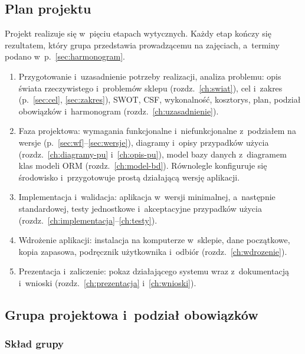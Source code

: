 \documentclass[12pt,a4paper,oneside]{article}
\newcounter{pu}
\begin{document}
\subsection{Plan projektu}
\label{sec:plan}

Projekt realizuje się w~pięciu etapach wytycznych. Każdy etap kończy się rezultatem, który grupa przedstawia prowadzącemu na zajęciach, a~terminy podano w~p.~\ref{sec:harmonogram}.

\begin{enumerate}[leftmargin=1.2cm]
	\item Przygotowanie i~uzasadnienie potrzeby realizacji, analiza problemu: opis świata rzeczywistego i~problemów sklepu (rozdz.~\ref{ch:swiat}), cel i~zakres (p.~\ref{sec:cel}, \ref{sec:zakres}), SWOT, CSF, wykonalność, kosztorys, plan, podział obowiązków i~harmonogram (rozdz.~\ref{ch:uzasadnienie}).
	\item Faza projektowa: wymagania funkcjonalne i~niefunkcjonalne z~podziałem na wersje (p.~\ref{sec:wf}--\ref{sec:wersje}), diagramy i~opisy przypadków użycia (rozdz.~\ref{ch:diagramy-pu} i~\ref{ch:opis-pu}), model bazy danych z~diagramem klas modeli ORM (rozdz.~\ref{ch:model-bd}). Równolegle konfiguruje się środowisko i~przygotowuje prostą działającą wersję aplikacji.
	\item Implementacja i~walidacja: aplikacja w~wersji minimalnej, a~następnie standardowej, testy jednostkowe i~akceptacyjne przypadków użycia (rozdz.~\ref{ch:implementacja}--\ref{ch:testy}).
	\item Wdrożenie aplikacji: instalacja na komputerze w~sklepie, dane początkowe, kopia zapasowa, podręcznik użytkownika i~odbiór (rozdz.~\ref{ch:wdrozenie}).
	\item Prezentacja i~zaliczenie: pokaz działającego systemu wraz z~dokumentacją i~wnioski (rozdz.~\ref{ch:prezentacja} i~\ref{ch:wnioski}).
\end{enumerate}

\subsection{Grupa projektowa i~podział obowiązków}
\label{sec:grupa}

\subsubsection{Skład grupy}
\end{document}
